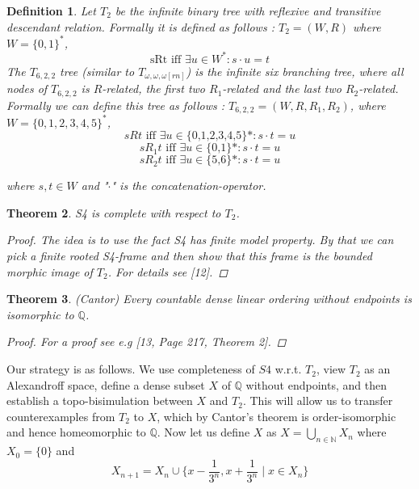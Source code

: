 \documentclass[12pt, a4paper]{scrartcl}
\newtheorem{definition}{Definition}[subsection]
\newtheorem{theorem}[definition]{Theorem}
\begin{document}
\begin{definition}
    Let $T_2$ be the infinite binary tree with reflexive and transitive descendant relation. \newline Formally it is defined as follows :
    $T_2 = (W,R)$ where $W = \{0,1\}^*$, 
    $$ \mbox{sRt iff }  \exists u\in W^* : s \cdot u = t$$ 
    The $T_ {6,2,2}$ tree (similar to $T_{\omega,\omega,\omega[rn]}$) is the infinite six branching tree, where all nodes of $T_ {6,2,2}$ is $R$-related, the first two $R_1$-related 
    and the last two $R_2$-related. Formally we can define this tree as follows : $T_ {6,2,2} = (W,R,R_1,R_2)$,
    where $W = \{{0,1,2,3,4,5}\}^*$, $$sRt \mbox{ iff } \exists u \in \mbox{\{0,1,2,3,4,5\}*} : s \cdot t = u $$
    $$ sR_1t  \mbox{ iff } \exists u \in \mbox{\{0,1\}*} : s \cdot t = u$$
    $$ sR_2t  \mbox{ iff } \exists u \in \mbox{\{5,6\}*} : s \cdot t = u$$
    
    where $s,t \in W$ and "$\cdot$" is the concatenation-operator.        
\end{definition}

\begin{theorem}
    S4 is complete with respect to $T_2$.

    \begin{proof}
    The idea is to use the fact S4 has finite model property. By that we can pick a finite rooted S4-frame and then show that this frame is the bounded morphic image of $T_2$.
        For details see [12].
    \end{proof}
\end{theorem}

\begin{theorem}

    (Cantor) Every countable dense linear ordering without endpoints is isomorphic to $\mathbb{Q}$.
    \begin{proof}
        For a proof see e.g [13, Page 217, Theorem 2].   
    \end{proof}

\end{theorem}

Our strategy is as follows. We use completeness of $S4$ w.r.t. $T_2$, view $T_2$ as an Alexandroff space, define a dense subset $X$ of $\mathbb{Q}$ without endpoints,
and then establish a topo-bisimulation between $X$ and $T_2$. This will allow us to transfer counterexamples from $T_2$ to $X$, which by Cantor's theorem
is order-isomorphic and hence homeomorphic to $\mathbb{Q}$. \newline 
Now let us define $X$ as $X = \bigcup_{n \in \mathbb{N}} X_n$ where $X_0 = \{0\}$ and 
$$X_{n+1} = X_n \cup \{x - \frac{1}{3^n}, x + \frac{1}{3^n} \mid x \in X_n\}$$
\end{document}

